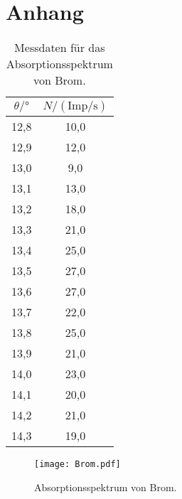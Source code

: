 \section{Anhang}
\begin{table}[H]
    \centering
    \caption{Messdaten für das Absorptionsspektrum von Brom.}
    \label{tab:Brom}
    \begin{tabular}{|c| c|}
    \toprule 
    $\theta/\mathrm{°}$ & $N/(\mathrm{Imp/s})$ \\
    \midrule
    12,8 &	10,0 \\
    12,9 &	12,0 \\
    13,0 &	9,0 \\
    13,1 &	13,0 \\
    13,2 &	18,0 \\
    13,3 &	21,0 \\
    13,4 &	25,0 \\
    13,5 &	27,0 \\
    13,6 &	27,0 \\
    13,7 &	22,0 \\
    13,8 &	25,0 \\
    13,9 &	21,0 \\
    14,0 &	23,0 \\
    14,1 &	20,0 \\
    14,2 &	21,0 \\
    14,3 &	19,0 \\
    \bottomrule
    \end{tabular}
\end{table}

\begin{figure}[H]
    \centering
    \texttt{[image: Brom.pdf]}
    \caption{Absorptionsspektrum von Brom.}
    \label{fig:Brom}
  \end{figure}

